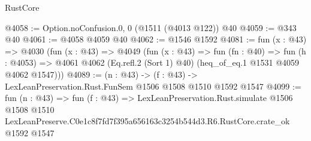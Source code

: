 \begin{lexlean}{RustCore}
\begin{coremodule}
@4058 := Option.noConfusion.{0, 0} (@1511 (@4013 @122)) @40
@4059 := @343 @40
@4061 := @4058 @4059 @40
@4062 := @1546 @1592
@4081 := fun (x : @43) =>
  @4030
    (fun (x : @43) =>
    @4049
      (fun (x : @43) =>
      fun (fn : @40) =>
      fun (h : @4053) =>
      @4061 @4062 (Eq.refl.{2} (Sort 1) @40) (heq_of_eq.{1} @1531 @4059 @4062 @1547)))
@4089 := (n : @43) -> (f : @43) -> LexLeanPreservation.Rust.FunSem @1506 @1508 @1510 @1592 @1547
@4099 := fun (n : @43) =>
  fun (f : @43) =>
  LexLeanPreservation.Rust.simulate
    @1506
    @1508
    @1510
    LexLeanPreserve.C0e1c8f7fd7f395a656163c3254b544d3.R6.RustCore.crate_ok
    @1592
    @1547
\end{coremodule}
\end{lexlean}
